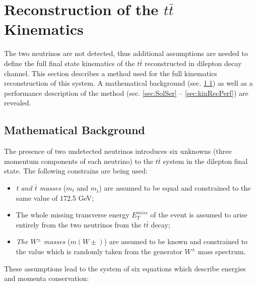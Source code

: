 \chapter{Reconstruction of the $t\bar{t}$ Kinematics}\label{chapt:kinReco}

The two neutrinos are not detected, thus additional
assumptions are needed to define the full final state kinematics of the $t\bar{t}$ reconstructed in dilepton decay channel.
This section describes a method used for the full kinematics reconstruction of this system. A mathematical
background (sec. \ref{sec:MatBg}) as well as a performance description of the method (sec. \ref{sec:SolSer} -- \ref{sec:kinRecPerf}) are revealed.

\section{Mathematical Background}\label{sec:MatBg}

The presence of two undetected neutrinos introduces six unknowns  (three momentum components of each neutrino)
to the $t\bar{t}$ system in the dilepton final state.
The following constrains are being used:

\begin{itemize}
 \item \textit{t and $\bar{t}$ masses} ($m_{t}$ and $m_ {\bar{t}}$) are assumed to be equal and constrained to the same value of 172.5 GeV\cite{PDG-2012};
 \item The whole missing transverse energy $E_{T}^{miss}$ of the event is assumed to arise entirely
 from the two neutrinos from the $t\bar{t}$ decay;
 \item \textit{The $W^{\pm}$ masses} ($m(W\pm)$) are assumed to be known and constrained to the value which is randomly taken
 from the generator $W^{\pm}$ mass spectrum.
\end{itemize}

These assumptions lead to the system of six equations which describe energies and momenta conservation:

